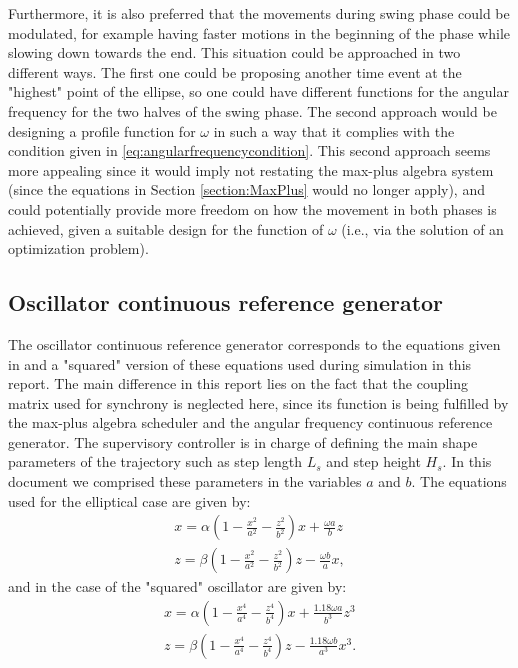 \documentclass[main.tex]{subfiles}
\begin{document}
Furthermore, it is also preferred that the movements during swing phase could be modulated, for example having faster motions in the beginning of the phase while slowing down towards the end. This situation could be approached in two different ways. The first one could be proposing another time event at the "highest" point of the ellipse, so one could have different functions for the angular frequency for the two halves of the swing phase. The second approach would be designing a profile function for $\omega$ in such a way that it complies with the condition given in \ref{eq:angularfrequencycondition}. This second approach seems more appealing since it would imply not restating the max-plus algebra system (since the equations in Section \ref{section:MaxPlus} would no longer apply), and could potentially provide more freedom on how the movement in both phases is achieved, given a suitable design for the function of $\omega$ (i.e., via the solution of an optimization problem).
\subsection{Oscillator continuous reference generator}
The oscillator continuous reference generator corresponds to the equations given in \cite{Barasuol2013} and a "squared" version of these equations used during simulation in this report. The main difference in this report lies on the fact that the coupling matrix used for synchrony is neglected here, since its function is being fulfilled by the max-plus algebra scheduler and the angular frequency continuous reference generator. The supervisory controller is in charge of defining the main shape parameters of the trajectory such as step length $L_s$ and step height $H_s$. In this document we comprised these parameters in the variables $a$ and $b$. The equations used for the elliptical case are given by:
\begin{align}
x = \alpha (1 - \frac{x^2}{a^2} - \frac{z^2}{b^2})x + \frac{\omega a}{b}z \\
z = \beta (1 - \frac{x^2}{a^2} - \frac{z^2}{b^2})z - \frac{\omega b}{a}x,
\end{align}
and in the case of the "squared" oscillator are given by:
\begin{align}
x = \alpha (1 - \frac{x^4}{a^4} - \frac{z^4}{b^4})x + \frac{1.18\omega a}{b^3}z^3 \\
z = \beta (1 - \frac{x^4}{a^4} - \frac{z^4}{b^4})z - \frac{1.18\omega b}{a^3}x^3.
\end{align}
\end{document}
